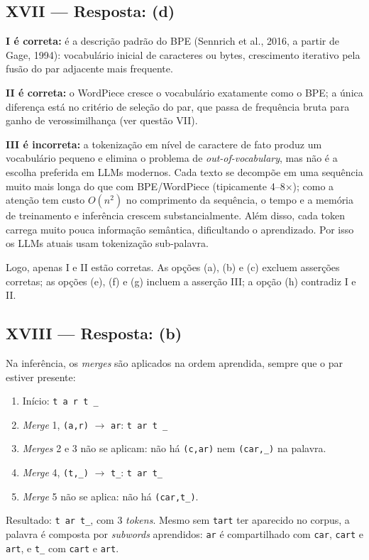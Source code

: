 \documentclass{dlproblemset}
\begin{document}
\subsection*{XVII — Resposta: (d)}
\textbf{I é correta:} é a descrição padrão do BPE (Sennrich et al., 2016, a partir de
Gage, 1994): vocabulário inicial de caracteres ou bytes, crescimento iterativo pela
fusão do par adjacente mais frequente.

\textbf{II é correta:} o WordPiece cresce o vocabulário exatamente como o BPE; a única
diferença está no critério de seleção do par, que passa de frequência bruta para ganho
de verossimilhança (ver questão VII).

\textbf{III é incorreta:} a tokenização em nível de caractere de fato produz um
vocabulário pequeno e elimina o problema de \textit{out-of-vocabulary}, mas não é a
escolha preferida em LLMs modernos. Cada texto se decompõe em uma sequência muito mais
longa do que com BPE/WordPiece (tipicamente 4--8$\times$); como a atenção tem custo
$O(n^2)$ no comprimento da sequência, o tempo e a memória de treinamento e inferência
crescem substancialmente. Além disso, cada token carrega muito pouca informação
semântica, dificultando o aprendizado. Por isso os LLMs atuais usam tokenização
sub-palavra.

Logo, apenas I e II estão corretas. As opções (a), (b) e (c) excluem asserções
corretas; as opções (e), (f) e (g) incluem a asserção III; a opção (h) contradiz I e II.

\subsection*{XVIII — Resposta: (b)}
Na inferência, os \textit{merges} são aplicados na ordem aprendida, sempre que o par
estiver presente:
\begin{enumerate}
  \item Início: \texttt{t a r t \_}
  \item \textit{Merge} 1, \texttt{(a,r)} $\rightarrow$ \texttt{ar}: \quad \texttt{t ar t \_}
  \item \textit{Merges} 2 e 3 não se aplicam: não há \texttt{(c,ar)} nem \texttt{(car,\_)} na palavra.
  \item \textit{Merge} 4, \texttt{(t,\_)} $\rightarrow$ \texttt{t\_}: \quad \texttt{t ar t\_}
  \item \textit{Merge} 5 não se aplica: não há \texttt{(car,t\_)}.
\end{enumerate}
Resultado: \texttt{t}~\texttt{ar}~\texttt{t\_}, com 3 \textit{tokens}. Mesmo sem
\texttt{tart} ter aparecido no corpus, a palavra é composta por \textit{subwords}
aprendidos: \texttt{ar} é compartilhado com \texttt{car}, \texttt{cart} e \texttt{art},
e \texttt{t\_} com \texttt{cart} e \texttt{art}.
\end{document}
